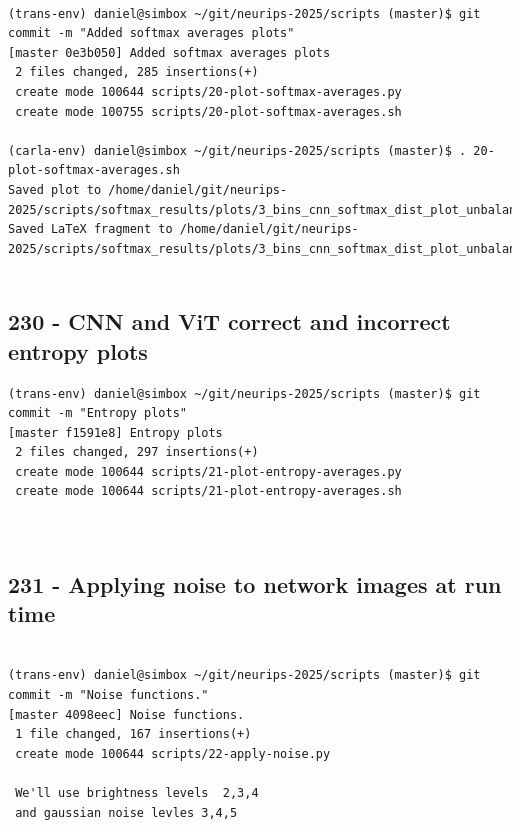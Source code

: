 \begin{verbatim}

(trans-env) daniel@simbox ~/git/neurips-2025/scripts (master)$ git commit -m "Added softmax averages plots"
[master 0e3b050] Added softmax averages plots
 2 files changed, 285 insertions(+)
 create mode 100644 scripts/20-plot-softmax-averages.py
 create mode 100755 scripts/20-plot-softmax-averages.sh
 
(carla-env) daniel@simbox ~/git/neurips-2025/scripts (master)$ . 20-plot-softmax-averages.sh
Saved plot to /home/daniel/git/neurips-2025/scripts/softmax_results/plots/3_bins_cnn_softmax_dist_plot_unbalanced.png
Saved LaTeX fragment to /home/daniel/git/neurips-2025/scripts/softmax_results/plots/3_bins_cnn_softmax_dist_plot_unbalanced.tex


\end{verbatim}

\subsection{230 - CNN and ViT correct and incorrect entropy plots}
\label{app_res:230}

\begin{verbatim}
(trans-env) daniel@simbox ~/git/neurips-2025/scripts (master)$ git commit -m "Entropy plots"
[master f1591e8] Entropy plots
 2 files changed, 297 insertions(+)
 create mode 100644 scripts/21-plot-entropy-averages.py
 create mode 100644 scripts/21-plot-entropy-averages.sh  

 
\end{verbatim}

\subsection{231 - Applying noise to network images at run time}
\label{app_res:231}

\begin{verbatim}

(trans-env) daniel@simbox ~/git/neurips-2025/scripts (master)$ git commit -m "Noise functions."
[master 4098eec] Noise functions.
 1 file changed, 167 insertions(+)
 create mode 100644 scripts/22-apply-noise.py

 We'll use brightness levels  2,3,4
 and gaussian noise levles 3,4,5

\end{verbatim}

